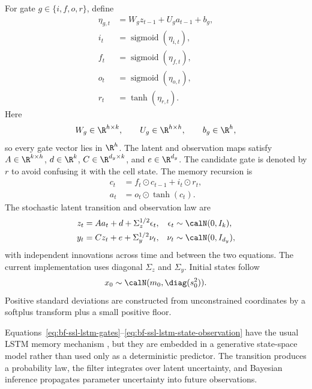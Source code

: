 For gate $g\in\{i,f,o,r\}$, define
\begin{align}
  \eta_{g,t}
    &= W_g z_{t-1}+U_g a_{t-1}+b_g,                                      \\
  i_t &= \operatorname{sigmoid}(\eta_{i,t}),                              \\
  f_t &= \operatorname{sigmoid}(\eta_{f,t}),                              \\
  o_t &= \operatorname{sigmoid}(\eta_{o,t}),                              \\
  r_t &= \tanh(\eta_{r,t}).
  \label{eq:bf-ssl-lstm-gates}
\end{align}
Here
\[
  W_g\in\R^{h\times k},\qquad
  U_g\in\R^{h\times h},\qquad
  b_g\in\R^h,
\]
so every gate vector lies in $\R^h$.  The latent and observation maps satisfy
$A\in\R^{k\times h}$, $d\in\R^k$, $C\in\R^{d_y\times k}$, and
$e\in\R^{d_y}$.
The candidate gate is denoted by $r$ to avoid confusing it with the cell state.
The memory recursion is
\begin{align}
  c_t &= f_t\odot c_{t-1}+i_t\odot r_t,                                    \\
  a_t &= o_t\odot\tanh(c_t).
  \label{eq:bf-ssl-lstm-memory}
\end{align}
The stochastic latent transition and observation law are
\begin{align}
  z_t &= A a_t+d+\Sigma_z^{1/2}\epsilon_t,
  &\epsilon_t&\sim\calN(0,I_k),                                           \\
  y_t &= C z_t+e+\Sigma_y^{1/2}\nu_t,
  &\nu_t&\sim\calN(0,I_{d_y}),
  \label{eq:bf-ssl-lstm-state-observation}
\end{align}
with independent innovations across time and between the two equations.  The
current implementation uses diagonal $\Sigma_z$ and $\Sigma_y$.  Initial
states follow
\begin{equation}
  x_0\sim\calN(m_0,\diag(s_0^2)).
  \label{eq:bf-ssl-lstm-initial-law}
\end{equation}
Positive standard deviations are constructed from unconstrained coordinates
by a softplus transform plus a small positive floor.

Equations~\eqref{eq:bf-ssl-lstm-gates}--\eqref{eq:bf-ssl-lstm-state-observation}
have the usual LSTM memory mechanism \citep{hochreiter1997lstm}, but they are
embedded in a generative state-space model rather than used only as a
deterministic predictor.  The transition produces a probability law, the
filter integrates over latent uncertainty, and Bayesian inference propagates
parameter uncertainty into future observations.

